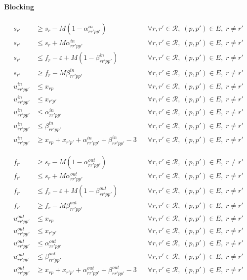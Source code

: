 \paragraph{Blocking}

\begin{align}
s_{r'} &\ge s_r - M \left( 1 - \alpha^{in}_{rr'pp'} \right)
&& \forall r,r' \in \mathcal{R},\; (p,p') \in E,\; r \neq r' \\
s_{r'} &\le s_r + M \alpha^{in}_{rr'pp'}
&& \forall r,r' \in \mathcal{R},\; (p,p') \in E,\; r \neq r' \\
s_{r'} &\le f_r - \varepsilon + M \left( 1 - \beta^{in}_{rr'pp'} \right)
&& \forall r,r' \in \mathcal{R},\; (p,p') \in E,\; r \neq r' \\
s_{r'} &\ge f_r - M \beta^{in}_{rr'pp'}
&& \forall r,r' \in \mathcal{R},\; (p,p') \in E,\; r \neq r' \\
u^{in}_{rr'pp'} &\le x_{rp}
&& \forall r,r' \in \mathcal{R},\; (p,p') \in E,\; r \neq r' \\
u^{in}_{rr'pp'} &\le x_{r'p'}
&& \forall r,r' \in \mathcal{R},\; (p,p') \in E,\; r \neq r' \\
u^{in}_{rr'pp'} &\le \alpha^{in}_{rr'pp'}
&& \forall r,r' \in \mathcal{R},\; (p,p') \in E,\; r \neq r' \\
u^{in}_{rr'pp'} &\le \beta^{in}_{rr'pp'}
&& \forall r,r' \in \mathcal{R},\; (p,p') \in E,\; r \neq r' \\
u^{in}_{rr'pp'} &\ge x_{rp} + x_{r'p'} + \alpha^{in}_{rr'pp'} + \beta^{in}_{rr'pp'} - 3
&& \forall r,r' \in \mathcal{R},\; (p,p') \in E,\; r \neq r'
\end{align}

\begin{align}
f_{r'} &\ge s_r - M \left( 1 - \alpha^{out}_{rr'pp'} \right)
&& \forall r,r' \in \mathcal{R},\; (p,p') \in E,\; r \neq r' \\
f_{r'} &\le s_r + M \alpha^{out}_{rr'pp'}
&& \forall r,r' \in \mathcal{R},\; (p,p') \in E,\; r \neq r' \\
f_{r'} &\le f_r - \varepsilon + M \left( 1 - \beta^{out}_{rr'pp'} \right)
&& \forall r,r' \in \mathcal{R},\; (p,p') \in E,\; r \neq r' \\
f_{r'} &\ge f_r - M \beta^{out}_{rr'pp'}
&& \forall r,r' \in \mathcal{R},\; (p,p') \in E,\; r \neq r' \\
u^{out}_{rr'pp'} &\le x_{rp}
&& \forall r,r' \in \mathcal{R},\; (p,p') \in E,\; r \neq r' \\
u^{out}_{rr'pp'} &\le x_{r'p'}
&& \forall r,r' \in \mathcal{R},\; (p,p') \in E,\; r \neq r' \\
u^{out}_{rr'pp'} &\le \alpha^{out}_{rr'pp'}
&& \forall r,r' \in \mathcal{R},\; (p,p') \in E,\; r \neq r' \\
u^{out}_{rr'pp'} &\le \beta^{out}_{rr'pp'}
&& \forall r,r' \in \mathcal{R},\; (p,p') \in E,\; r \neq r' \\
u^{out}_{rr'pp'} &\ge x_{rp} + x_{r'p'} + \alpha^{out}_{rr'pp'} + \beta^{out}_{rr'pp'} - 3
&& \forall r,r' \in \mathcal{R},\; (p,p') \in E,\; r \neq r'
\end{align}

